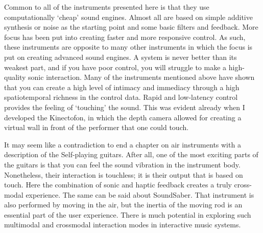 Common to all of the instruments presented here is that they use computationally `cheap' sound engines. Almost all are based on simple additive synthesis or noise as the starting point and some basic filters and feedback. More focus has been put into creating faster and more responsive control. As such, these instruments are opposite to many other instruments in which the focus is put on creating advanced sound engines. A system is never better than its weakest part, and if you have poor control, you will struggle to make a high-quality sonic interaction. Many of the instruments mentioned above have shown that you can create a high level of intimacy and immediacy through a high spatiotemporal richness in the control data. Rapid and low-latency control provides the feeling of `touching' the sound. This was evident already when I developed the Kinectofon, in which the depth camera allowed for creating a virtual wall in front of the performer that one could touch.

It may seem like a contradiction to end a chapter on air instruments with a description of the Self-playing guitars. After all, one of the most exciting parts of the guitars is that you can feel the sound vibration in the instrument body. Nonetheless, their interaction is touchless; it is their output that is based on touch. Here the combination of sonic and haptic feedback creates a truly cross-modal experience. The same can be said about SoundSaber. That instrument is also performed by moving in the air, but the inertia of the moving rod is an essential part of the user experience. There is much potential in exploring such multimodal and crossmodal interaction modes in interactive music systems.
